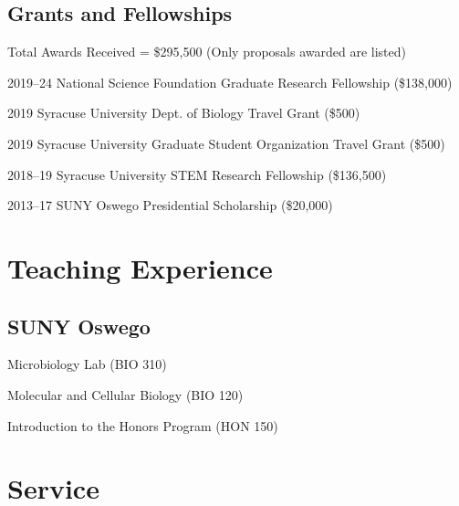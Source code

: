 \documentclass[12pt,letterpaper]{report}
\newcommand{\listitemspace}{0.15em}
\renewenvironment{itemize}
{\begin{list}{}{\setlength{\leftmargin}{0em}
            \setlength{\parskip}{0em}
            \setlength{\itemsep}{\listitemspace}
            \setlength{\parsep}{\listitemspace}}}
    {\end{list}}
\begin{document}
    \subsection*{Grants and Fellowships}

    \begin{tablist}
    	\item Total Awards Received = \$295,500 (Only proposals awarded are listed)

        \item[2019--24] \tab National Science Foundation Graduate Research Fellowship (\$138,000)
        
        \item[2019] \tab Syracuse University Dept. of Biology Travel Grant (\$500)
        
        \item[2019] \tab Syracuse University Graduate Student Organization Travel Grant (\$500)
        
        \item[2018--19] \tab Syracuse University STEM Research Fellowship (\$136,500)
        
        \item[2013--17] \tab SUNY Oswego Presidential Scholarship (\$20,000)
        
    \end{tablist}



    \section*{Teaching Experience}

    \subsection*{SUNY Oswego}
    
    \begin{itemize}
    	
    	\item Microbiology Lab (BIO 310)
    	\item Molecular and Cellular Biology (BIO 120)
    	\item Introduction to the Honors Program (HON 150)
    
	\end{itemize}
    	

    \section*{Service}
    
\end{document}
